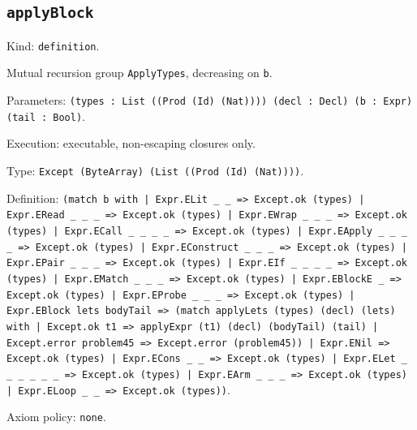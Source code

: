\documentclass[11pt]{article}
\begin{document}
\subsection*{\texttt{applyBlock}}
\noindent Kind: \texttt{definition}.\par
\noindent Mutual recursion group \texttt{ApplyTypes}, decreasing on \texttt{b}.\par
\noindent Parameters: \texttt{(types : List ((Prod (Id) (Nat)))) (decl : Decl) (b : Expr) (tail : Bool)}.\par
\noindent Execution: executable, non-escaping closures only.\par
\noindent Type: \texttt{Except (ByteArray) (List ((Prod (Id) (Nat))))}.\par
\noindent Definition: \texttt{(match b with | Expr.ELit \_ \_ => Except.ok (types) | Expr.ERead \_ \_ \_ => Except.ok (types) | Expr.EWrap \_ \_ \_ => Except.ok (types) | Expr.ECall \_ \_ \_ \_ => Except.ok (types) | Expr.EApply \_ \_ \_ \_ => Except.ok (types) | Expr.EConstruct \_ \_ \_ => Except.ok (types) | Expr.EPair \_ \_ \_ => Except.ok (types) | Expr.EIf \_ \_ \_ \_ => Except.ok (types) | Expr.EMatch \_ \_ \_ => Except.ok (types) | Expr.EBlockE \_ => Except.ok (types) | Expr.EProbe \_ \_ \_ => Except.ok (types) | Expr.EBlock lets bodyTail => (match applyLets (types) (decl) (lets) with | Except.ok t1 => applyExpr (t1) (decl) (bodyTail) (tail) | Except.error problem45 => Except.error (problem45)) | Expr.ENil => Except.ok (types) | Expr.ECons \_ \_ => Except.ok (types) | Expr.ELet \_ \_ \_ \_ \_ \_ => Except.ok (types) | Expr.EArm \_ \_ \_ => Except.ok (types) | Expr.ELoop \_ \_ => Except.ok (types))}.\par
\noindent Axiom policy: \texttt{none}.\par
\end{document}
